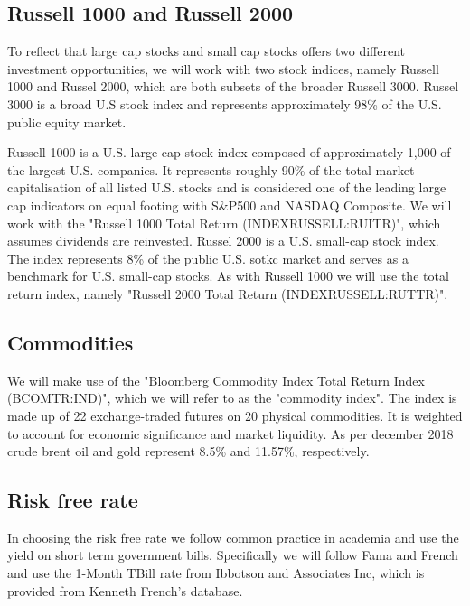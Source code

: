 \documentclass[11pt,a4paper,oneside]{article}
\begin{document}
\subsection*{Russell 1000 and Russell 2000}
\noindent To reflect that large cap stocks and small cap stocks offers two different investment opportunities, we will work with two stock indices, namely Russell 1000 and Russel 2000, which are both subsets of the broader Russell 3000. Russel 3000 is a broad U.S stock index and represents approximately 98\% of the U.S. public equity market.     

Russell 1000 is a U.S. large-cap stock index  composed of approximately 1,000 of the largest U.S. companies. It represents roughly 90\% of the total market capitalisation of all listed U.S. stocks and is considered one of the leading large cap indicators on equal footing with S\&P500 and NASDAQ Composite. We will work with the "Russell 1000 Total Return (INDEXRUSSELL:RUITR)", which assumes dividends are reinvested. Russel 2000 is a U.S. small-cap stock index. The index represents 8\% of the public U.S. sotkc market and serves as a benchmark for U.S. small-cap stocks. As with Russell 1000 we will use the total return index, namely "Russell 2000 Total Return (INDEXRUSSELL:RUTTR)". 

\subsection*{Commodities}
\noindent We will make use of the "Bloomberg Commodity Index Total Return Index (BCOMTR:IND)", which we will refer to as the "commodity index". The index is made up of 22 exchange-traded futures on 20 physical commodities. It is weighted to account for economic significance and market liquidity. As per december 2018 crude brent oil and gold represent 8.5\% and 11.57\%, respectively. 

\subsection*{Risk free rate}
\noindent In choosing the risk free rate  we follow common practice in academia and use the yield on short term government bills\cite{riskfreerate}. Specifically we will follow Fama and French and use the 1-Month TBill rate from Ibbotson and Associates Inc, which is provided from Kenneth French's database. 
\end{document}
